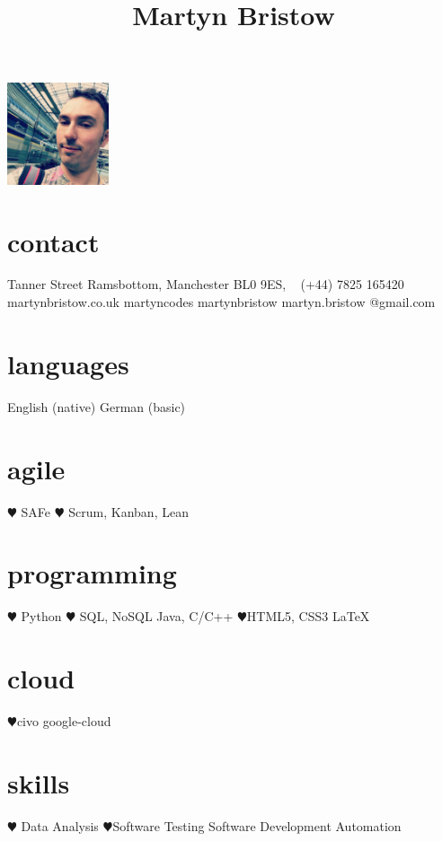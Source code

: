 \documentclass[]{cv-style}          %
\begin{document}
\lastupdated
\title{Martyn Bristow}


\begin{aside}
%
\includegraphics[width=3cm]{martyn-eurostar.jpg}
\section{contact}
 Tanner Street
\hspace*{25pt} Ramsbottom, Manchester
\hspace*{25pt} BL0 9ES,
~
\faPhone (+44) 7825 165420
~
{\faGlobe martynbristow.co.uk}
{\faTwitter martyncodes}
{\faGithub martynbristow}
{\faEnvelope martyn.bristow
@gmail.com}
\section{languages}
English (native)
German (basic)
%
\section{agile}
{\color{red} $\varheartsuit$} SAFe {\color{red} $\varheartsuit$} Scrum, Kanban, Lean
\section{programming}
{\color{red} $\varheartsuit$} Python
{\color{red} $\varheartsuit$} SQL, NoSQL
Java, C/C++
{\color{red} $\varheartsuit$}HTML5, CSS3 \LaTeX{}
\section{cloud}
{\color{red} $\varheartsuit$}civo google-cloud
\section{skills}
{\color{red} $\varheartsuit$} Data Analysis
{\color{red} $\varheartsuit$}Software Testing
Software Development
Automation

\end{aside}
\end{document}
